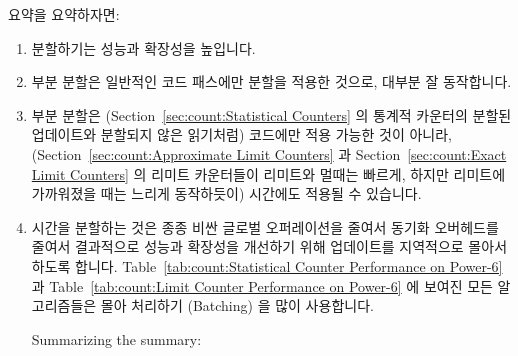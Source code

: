 요약을 요약하자면:

\begin{enumerate}
\item	분할하기는 성능과 확장성을 높입니다.
\item	부분 분할은 일반적인 코드 패스에만 분할을 적용한 것으로, 대부분 잘
	동작합니다.
\item	부분 분할은 (Section~\ref{sec:count:Statistical Counters} 의 통계적
	카운터의 분할된 업데이트와 분할되지 않은 읽기처럼) 코드에만 적용 가능한
	것이 아니라, (Section~\ref{sec:count:Approximate Limit Counters} 과
	Section~\ref{sec:count:Exact Limit Counters} 의 리미트 카운터들이
	리미트와 멀때는 빠르게, 하지만 리미트에 가까워졌을 때는 느리게
	동작하듯이) 시간에도 적용될 수 있습니다.
\item	시간을 분할하는 것은 종종 비싼 글로벌 오퍼레이션을 줄여서 동기화
	오버헤드를 줄여서 결과적으로 성능과 확장성을 개선하기 위해 업데이트를
	지역적으로 몰아서 하도록 합니다.
	Table~\ref{tab:count:Statistical Counter Performance on Power-6} 과
	Table~\ref{tab:count:Limit Counter Performance on Power-6} 에 보여진
	모든 알고리즘들은 몰아 처리하기 (Batching) 을 많이 사용합니다.
\iffalse

Summarizing the summary:


\end{enumerate}
